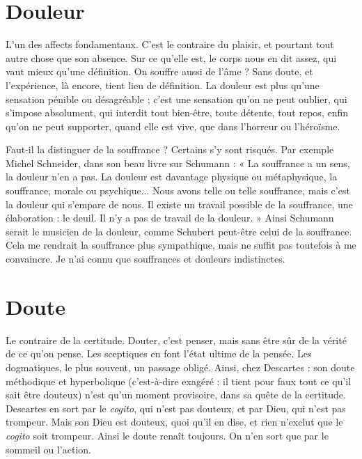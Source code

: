 \section{Douleur}
L'un des affects fondamentaux. C’est le contraire du plaisir, et
pourtant tout autre chose que son absence. Sur ce qu’elle est, le
corps nous en dit assez, qui vaut mieux qu’une définition. On souffre aussi de
l’âme ? Sans doute, et l’expérience, là encore, tient lieu de définition. La douleur
est plus qu’une sensation pénible ou désagréable ; c’est une sensation
qu’on ne peut oublier, qui s'impose absolument, qui interdit tout bien-être,
toute détente, tout repos, enfin qu’on ne peut supporter, quand elle est vive,
que dans l’horreur ou l’héroïsme.

Faut-il la distinguer de la souffrance ? Certains s’y sont risqués. Par exemple
Michel Schneider, dans son beau livre sur Schumann : « La souffrance a un
sens, la douleur n’en a pas. La douleur est davantage physique ou métaphysique,
la souffrance, morale ou psychique... Nous avons telle ou telle souffrance,
mais c’est la douleur qui s'empare de nous. Il existe un travail possible
de la souffrance, une élaboration : le deuil. Il n’y a pas de travail de la douleur. »
Ainsi Schumann serait le musicien de la douleur, comme Schubert peut-être
celui de la souffrance. Cela me rendrait la souffrance plus sympathique, mais
ne suffit pas toutefois à me convaincre. Je n’ai connu que souffrances et douleurs
indistinctes.

\section{Doute}
Le contraire de la certitude. Douter, c’est penser, mais sans être
sûr de la vérité de ce qu’on pense. Les sceptiques en font l’état
ultime de la pensée. Les dogmatiques, le plus souvent, un passage obligé. Ainsi,
chez Descartes : son doute méthodique et hyperbolique (c’est-à-dire exagéré : il
tient pour faux tout ce qu’il sait être douteux) n’est qu’un moment provisoire,
dans sa quête de la certitude. Descartes en sort par le {\it cogito}, qui n’est pas douteux,
et par Dieu, qui n’est pas trompeur. Mais son Dieu est douteux, quoi
qu'il en dise, et rien n’exclut que le {\it cogito} soit trompeur. Ainsi le doute renaît
toujours. On n’en sort que par le sommeil ou l’action.

